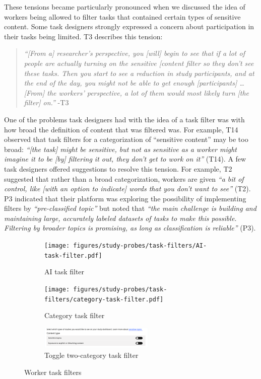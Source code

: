 These tensions became particularly pronounced when we discussed the idea of workers being allowed to filter tasks that contained certain types of sensitive content. Some task designers strongly expressed a concern about participation in their tasks being limited. T3 describes this tension:
\begin{quote}
    \textit{``[From a] researcher's perspective, you [will] begin to see that if a lot of people are actually turning on the sensitive [content filter so they don't see these tasks. Then you start to see a reduction in study participants, and at the end of the day, you might not be able to get enough [participants] \dots [From] the workers' perspective,  a lot of them would most likely turn [the filter] on.''} -T3
\end{quote} 
One of the problems task designers had with the idea of a task filter was with how broad the definition of content that was filtered was. For example, T14 observed that task filters for a categorization of ``sensitive content'' may be too broad: \textit{``[the task] might be sensitive, but not as sensitive as a worker might imagine it to be [by] filtering it out, they don't get to work on it''} (T14). A few task designers offered suggestions to resolve this tension. For example, T2 suggested that rather than a broad categorization, workers are given \textit{``a bit of control, like [with an option to indicate] words that you don't want to see''} (T2). P3 indicated that their platform was exploring the possibility of implementing filters by \textit{``pre-classified topic''} but noted that \textit{``the main challenge is building and maintaining large, accurately labeled datasets of tasks to make this possible. Filtering by broader topics is promising, as long as classification is reliable''} (P3). 



\begin{figure}
    \centering
    \begin{subfigure}[b]{0.48\textwidth}
        \centering
        \texttt{[image: figures/study-probes/task-filters/AI-task-filter.pdf]} 
        \caption{AI task filter}
    \end{subfigure}
    \hfill
    \begin{subfigure}[b]{0.48\textwidth}
        \centering
        \texttt{[image: figures/study-probes/task-filters/category-task-filter.pdf]} 
        \caption{Category task filter}
    \end{subfigure}
    \vspace{1em} %
    \begin{subfigure}[b]{0.98\textwidth}
        \centering
        \includegraphics[width=0.6\textwidth]{figures/study-probes/task-filters/toggle-task-filter.pdf}
        \caption{Toggle two-category task filter}
    \end{subfigure}
    \caption{Worker task filters}
    \label{fig:worker-task-filters}
\end{figure}

